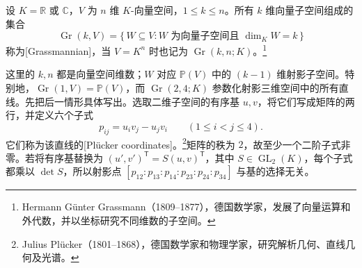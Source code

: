 \begin{definition}[Grassmann 空间]\label{g1:def:grassmannian}
	设 \(K=\mathbb R\) 或 \(\mathbb C\)，\(V\) 为 \(n\) 维 \(K\)-向量空间，\(1\le k\le n\)。所有 \(k\) 维向量子空间组成的集合
	\[
		\operatorname{Gr}(k,V)=\{\,W\subseteq V:W\text{ 为向量子空间且 }\dim_K W=k\,\}
	\]
	称为[Grassmannian]，当 \(V=K^n\) 时也记为 \(\operatorname{Gr}(k,n;K)\)。\footnote{Hermann Günter Grassmann（1809--1877），德国数学家，发展了向量运算和外代数，并以坐标研究不同维数的子空间。}
\end{definition}

这里的 \(k,n\) 都是向量空间维数；\(W\) 对应 \(\mathbb P(V)\) 中的 \((k-1)\) 维射影子空间。特别地，\(\operatorname{Gr}(1,V)=\mathbb P(V)\)，而 \(\operatorname{Gr}(2,4;K)\) 参数化射影三维空间中的所有直线。先把后一情形具体写出。选取二维子空间的有序基 \(u,v\)，将它们写成矩阵的两行，并定义六个子式
\[
	p_{ij}=u_i v_j-u_j v_i\qquad(1\le i<j\le4).
\]
它们称为该直线的[Plücker coordinates]。\footnote{Julius Plücker（1801--1868），德国数学家和物理学家，研究解析几何、直线几何及光谱。}矩阵的秩为 \(2\)，故至少一个二阶子式非零。若将有序基替换为 \((u',v')^{\mathsf T}=S(u,v)^{\mathsf T}\)，其中 \(S\in\operatorname{GL}_2(K)\)，每个子式都乘以 \(\det S\)，所以射影点 \([p_{12}:p_{13}:p_{14}:p_{23}:p_{24}:p_{34}]\) 与基的选择无关。

